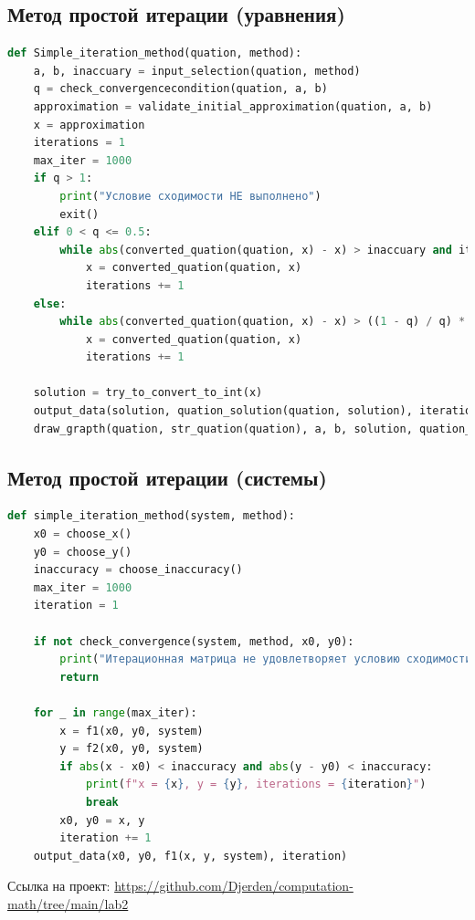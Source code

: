 \documentclass[a4paper,12pt]{article}
\begin{document}
\subsection*{Метод простой итерации (уравнения)}
\begin{lstlisting}[language=Python, caption=Листинг: Метод простой итерации]
def Simple_iteration_method(quation, method):
    a, b, inaccuary = input_selection(quation, method)
    q = check_convergencecondition(quation, a, b)
    approximation = validate_initial_approximation(quation, a, b)
    x = approximation
    iterations = 1
    max_iter = 1000
    if q > 1:
        print("Условие сходимости НЕ выполнено")
        exit()
    elif 0 < q <= 0.5:
        while abs(converted_quation(quation, x) - x) > inaccuary and iterations < max_iter:
            x = converted_quation(quation, x)
            iterations += 1
    else:
        while abs(converted_quation(quation, x) - x) > ((1 - q) / q) * inaccuary and iterations < max_iter:
            x = converted_quation(quation, x)
            iterations += 1

    solution = try_to_convert_to_int(x)
    output_data(solution, quation_solution(quation, solution), iterations, str_quation(quation))
    draw_grapth(quation, str_quation(quation), a, b, solution, quation_solution(quation, solution))
\end{lstlisting}

\subsection*{Метод простой итерации (системы)}
\begin{lstlisting}[language=Python, caption=Листинг: Метод простой итерации для систем]
def simple_iteration_method(system, method):
    x0 = choose_x()
    y0 = choose_y()
    inaccuracy = choose_inaccuracy()
    max_iter = 1000
    iteration = 1

    if not check_convergence(system, method, x0, y0):
        print("Итерационная матрица не удовлетворяет условию сходимости.")
        return

    for _ in range(max_iter):
        x = f1(x0, y0, system)
        y = f2(x0, y0, system)
        if abs(x - x0) < inaccuracy and abs(y - y0) < inaccuracy:
            print(f"x = {x}, y = {y}, iterations = {iteration}")
            break
        x0, y0 = x, y
        iteration += 1
    output_data(x0, y0, f1(x, y, system), iteration)
\end{lstlisting}
Ссылка на проект: \url{https://github.com/Djerden/computation-math/tree/main/lab2}
\end{document}
